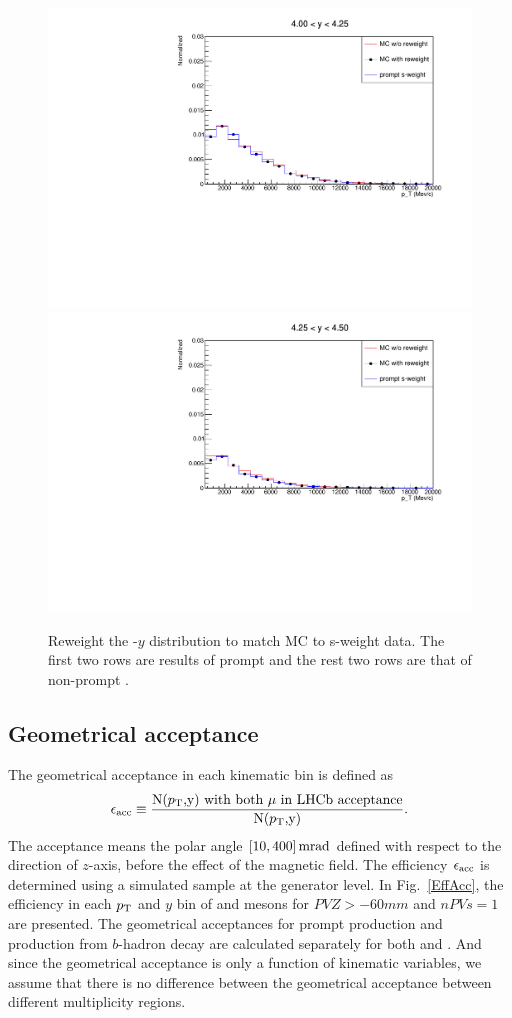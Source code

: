 \begin{figure}[h]
\begin{center}
      \includegraphics[width=0.19\linewidth]{pdf/Psi2S/reweight/Yb9.pdf}
      \includegraphics[width=0.19\linewidth]{pdf/Psi2S/reweight/Yb10.pdf}
    \end{center}
    \caption{
        Reweight the \pt-$y$ distribution to match MC to s-weight data. The first two rows are results of prompt \psitwos and the rest two rows are that of non-prompt \psitwos. } 
    \label{PreweightPTY}
\end{figure}
	
\subsection{Geometrical acceptance}
The geometrical acceptance in each kinematic bin is defined as
\begin{equation}
\effAcc \equiv \frac{\mbox{N($\pt$,y) with both $\mu$ in \lhcb acceptance}}{\mbox{N($\pt$,y)}}. 
\end{equation}
The \lhcb acceptance means the polar angle $[10,400]\text{\,mrad}$ defined with respect to the direction of 
\lhcb $z$-axis, before the effect of the magnetic field. The efficiency $\epsilon_{\mathrm{acc}}$ is determined using 
a simulated sample at the generator level. In Fig.~\ref{EffAcc}, the efficiency in each $p_{\mathrm{T}}$ and 
$y$ bin of \jpsi and \psitwos mesons for $PVZ>-60mm$ and $nPVs=1$ are presented. The geometrical acceptances 
for prompt production and production from $b$-hadron decay are calculated separately for both \jpsi and 
\psitwos. And since the geometrical acceptance is only a function of kinematic variables, we assume that 
there is no difference between the geometrical acceptance between different multiplicity regions.

